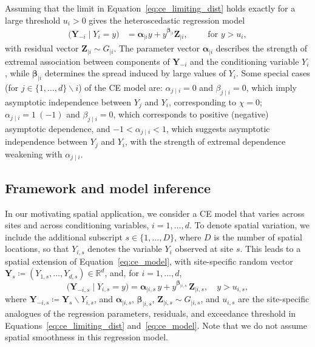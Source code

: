 \documentclass[12pt,compact]{article}
\begin{document}
Assuming that the limit in Equation~\eqref{eq:ce_limiting_dist} holds exactly for a large threshold $u_i > 0$ gives the heteroscedastic regression model
\begin{align}\label{eq:ce_model}
\bigl(\symbf{Y}_{-i} \mid Y_i = y \bigr) &= \symbf{\alpha}_{\mid i}y + y^{\symbf{\beta}_{\mid i}}\symbf{Z}_{\mid i},\qquad \text{ for } y > u_i,
\end{align}
with residual vector $\symbf{Z}_{\mid i} \sim G_{\mid i}$.
The parameter vector $\symbf{\alpha}_{\mid i}$ describes the strength of extremal association between components of $\symbf{Y}_{-i}$ and the conditioning variable $Y_i$, while $\symbf{\beta}_{\mid i}$ determines the spread induced by large values of $Y_i$. 
Some special cases (for $j\in\{1,\ldots,d\} \backslash i$) of the CE model are:
$\alpha_{j\mid i}=0$ and $\beta_{j\mid i}=0$, which imply asymptotic independence between $Y_j$ and $Y_i$, corresponding to $\chi=0$;
$\alpha_{j\mid i}=1\ ( -1)$ and $\beta_{j\mid i}=0$, which corresponds to positive (negative) asymptotic dependence, and
$-1<\alpha_{j\mid i}<1$, which suggests asymptotic independence between $Y_j$ and $Y_i$, with the strength of extremal dependence weakening with $\alpha_{j \mid i}$. 

\subsection{Framework and model inference}
\label{subsec:ce_setup}

In our motivating spatial application, we consider a CE model that varies across sites and across conditioning variables, $i = 1, \ldots, d$.
To denote spatial variation, we include the additional subscript $s \in \{1, \ldots, D\}$, where $D$ is the number of spatial locations, so that $Y_{i,s}$ denotes the variable $Y_i$ observed at site $s$.
This leads to a spatial extension of Equation~\eqref{eq:ce_model}, with site-specific random vector $\symbf{Y}_{s} \coloneq \left(Y_{1,s}, \ldots, Y_{d,s}\right) \in \mathbb{R}^d$, and, for $i = 1, \ldots, d$,
\begin{equation} \label{eq:ce_model_spat}
  \bigl(\symbf{Y}_{-i, s} \mid Y_{i, s} = y\bigr) 
    = \symbf{\alpha}_{\mid i, s} \, y 
      + y^{\symbf{\beta}_{\mid i, s}} \, \symbf{Z}_{\mid i, s}, 
      \quad y > u_{i, s}, 
\end{equation}
where $\symbf{Y}_{-i, s} \coloneqq \symbf{Y}_{s} \backslash Y_{i, s}$, and $\symbf{\alpha}_{\mid i, s}$, $\symbf{\beta}_{\mid i, s}$, $\symbf{Z}_{\mid i, s} \sim G_{\mid i, s}$, and $u_{i, s}$ are the site-specific analogues of the regression parameters, residuals, and exceedance threshold in Equations~\eqref{eq:ce_limiting_dist} and~\eqref{eq:ce_model}.
Note that we do not assume spatial smoothness in this regression model.
\end{document}

